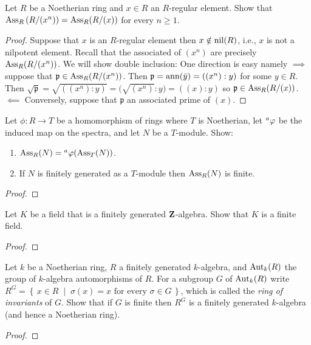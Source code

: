 \newpage
\begin{problem}
Let $R$ be a Noetherian ring and $x\in R$ an $R$-regular
element. Show that $\Ass_R\left(R/(x^n)\right)=\Ass_R(R/(x))$ for
every $n\geq 1$.
\end{problem}
\begin{proof}
Suppose that $x$ is an $R$-regular element then $x\notin\nil(R)$,
i.e., $x$ is not a nilpotent element. Recall that the associated
of $(x^n)$ are precisely $\Ass_R(R/(x^n))$. We will show double
inclusion: One direction is easy namely $\implies$ suppose that
$\mathfrak{p}\in\Ass_R(R/(x^n))$. Then $\mathfrak{p}=\ann(\bar
y)=((x^n):y)$ for some $y\in R$. Then
$\sqrt{\mathfrak{p}}=\sqrt{((x^n):y)}=\bigl(\sqrt{(x^n)}:y\bigr)=((x):y)$
so $\mathfrak{p}\in\Ass_R(R/(x))$. $\impliedby$ Conversely, suppose that
$\mathfrak{p}$ an associated prime of $(x)$.
\end{proof}
\newpage
\begin{problem}
Let $\phi\colon R\to T$ be a homomorphism of rings where $T$ is
Noetherian, let $\prescript{a}{}\phi$ be the induced map on the spectra,
and let $N$ be a $T$-module. Show:
\begin{enumerate}[label=(\alph*)]
\item $\Ass_R(N)=\prescript{a}{}\phi(\Ass_T(N))$.
\item If $N$ is finitely generated as a $T$-module then
  $\Ass_R(N)$ is finite.
\end{enumerate}
\end{problem}
\begin{proof}
\end{proof}
\newpage
\begin{problem}
Let $K$ be a field that is a finitely generated
$\ZZ$-algebra. Show that $K$ is a finite field.
\end{problem}
\begin{proof}
\end{proof}
\newpage
\begin{problem}
Let $k$ be a Noetherian ring, $R$ a finitely generated
$k$-algebra, and $\Aut_k(R)$ the group of $k$-algebra
automorphisms of $R$. For a subgroup $G$ of $\Aut_k(R)$ write
$R^G=\left\{\,x\in R\;\middle|\;\text{$\sigma(x)=x$ for every
    $\sigma\in G$}\,\right\}$, which is called the \emph{ring of
  invariants} of $G$. Show that if $G$ is finite then $R^G$ is a
finitely generated $k$-algebra (and hence a Noetherian ring).
\end{problem}
\begin{proof}
\end{proof}

